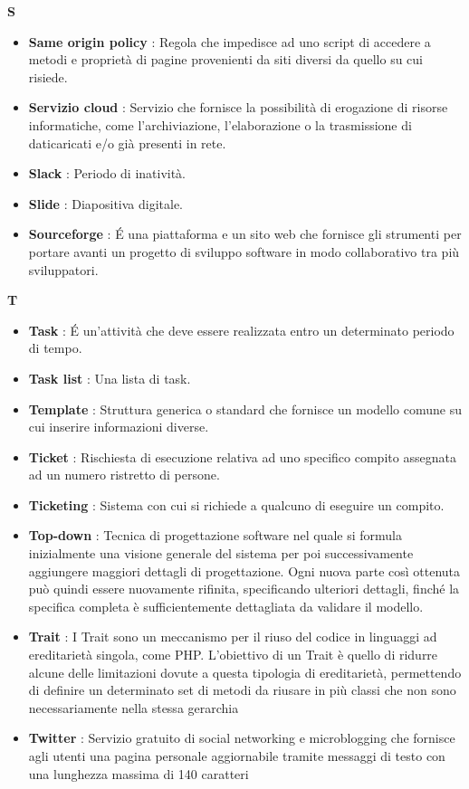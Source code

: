 \newpage
{\huge \textbf{S}}
\begin{flushleft}
\begin{itemize}[label={}]
\item \textbf{Same origin policy} : Regola che impedisce ad uno script di accedere a metodi e proprietà di pagine provenienti da siti diversi da quello su cui risiede.
\item \textbf{Servizio cloud} : Servizio che fornisce la possibilità di erogazione di risorse informatiche, come l'archiviazione, l'elaborazione o la trasmissione di daticaricati e/o già presenti in rete.
\item \textbf{Slack} : Periodo di inatività.
\item \textbf{Slide} : Diapositiva digitale.
\item \textbf{Sourceforge} : \'E una piattaforma e un sito web che fornisce gli strumenti per portare avanti un progetto di sviluppo software in modo collaborativo tra più sviluppatori.
\end{itemize}
\end{flushleft}
\newpage
{\huge \textbf{T}}
\begin{flushleft}
\begin{itemize}[label={}]
\item \textbf{Task} : \'E un'attività che deve essere realizzata entro un determinato periodo di tempo.
\item \textbf{Task list} : Una lista di task.
\item \textbf{Template} : Struttura generica o standard che fornisce un modello comune su cui inserire informazioni diverse.
\item \textbf{Ticket} : Rischiesta di esecuzione relativa ad uno specifico compito assegnata ad un numero ristretto di persone.
\item \textbf{Ticketing} : Sistema con cui si richiede a qualcuno di eseguire un compito.
\item \textbf{Top-down} : Tecnica di progettazione software nel quale si formula inizialmente una visione generale del sistema per poi successivamente aggiungere maggiori dettagli di progettazione. Ogni nuova parte così ottenuta può quindi essere nuovamente rifinita, specificando ulteriori dettagli, finché la specifica completa è sufficientemente dettagliata da validare il modello.
\item \textbf{Trait} : I Trait sono un meccanismo per il riuso del codice in linguaggi ad ereditarietà singola, come PHP. L'obiettivo di un Trait è quello di ridurre alcune delle limitazioni dovute a questa tipologia di ereditarietà, permettendo di definire un determinato set di metodi da riusare in più classi che non sono necessariamente nella stessa gerarchia
\item \textbf{Twitter} : Servizio gratuito di social networking e microblogging che fornisce agli utenti una pagina personale aggiornabile tramite messaggi di testo con una lunghezza massima di 140 caratteri
\end{itemize}
\end{flushleft}

